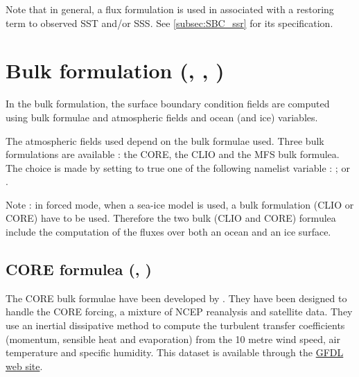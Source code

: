 \documentclass[../tex_main/NEMO_manual]{subfiles}
\begin{document}
Note that in general, a flux formulation is used in associated with a 
restoring term to observed SST and/or SSS. See \autoref{subsec:SBC_ssr} for its 
specification.


\section[Bulk formulation {(\textit{sbcblk\{\_core,\_clio,\_mfs\}.F90})}]
			{Bulk formulation {(\protect{}, \protect{}, \protect{})}}
\label{sec:SBC_blk}

In the bulk formulation, the surface boundary condition fields are computed 
using bulk formulae and atmospheric fields and ocean (and ice) variables. 

The atmospheric fields used depend on the bulk formulae used. Three bulk formulations 
are available : the CORE, the CLIO and the MFS bulk formulea. The choice is made by setting to true
one of the following namelist variable :  ;  or  .

Note : in forced mode, when a sea-ice model is used, a bulk formulation (CLIO or CORE) have to be used. 
Therefore the two bulk (CLIO and CORE) formulea include the computation of the fluxes over both 
an ocean and an ice surface. 

\subsection{CORE formulea (\protect{}, \protect{})}
\label{subsec:SBC_blk_core}

The CORE bulk formulae have been developed by \citet{Large_Yeager_Rep04}. 
They have been designed to handle the CORE forcing, a mixture of NCEP 
reanalysis and satellite data. They use an inertial dissipative method to compute 
the turbulent transfer coefficients (momentum, sensible heat and evaporation) 
from the 10 metre wind speed, air temperature and specific humidity.
This \citet{Large_Yeager_Rep04} dataset is available through the 
\href{http://nomads.gfdl.noaa.gov/nomads/forms/mom4/CORE.html}{GFDL web site}. 
\end{document}
